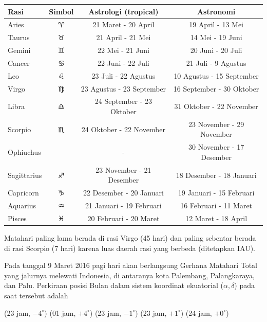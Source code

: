 \documentclass[11pt,fleqn, a4paper]{exam}
\begin{document}
\begin{questions}
\begin{tabular}{|l|c|c|c|}
\hline 
\textbf{Rasi} & \textbf{Simbol} & \textbf{Astrologi (tropical)} & \textbf{Astronomi} \\ 
\hline 
Aries & $\aries$ & 21 Maret - 20 April & 19 April - 13 Mei \\ 
\hline 
Taurus & $\taurus$ & 21 April - 21 Mei &  14 Mei - 19 Juni\\ 
\hline 
Gemini & $\gemini$ & 22 Mei - 21 Juni & 20 Juni - 20 Juli \\ 
\hline 
Cancer & $\cancer$ & 22 Juni - 22 Juli & 21 Juli - 9 Agustus \\ 
\hline 
Leo & $\leo$ & 23 Juli - 22 Agustus & 10 Agustus - 15 September \\ 
\hline 
Virgo & $\virgo$ & 23 Agustus - 23 September & 16 September - 30 Oktober \\ 
\hline 
Libra & $\libra$ & 24 September - 23 Oktober & 31 Oktober - 22 November \\ 
\hline 
Scorpio & $\scorpio$ & 24 Oktober - 22 November & 23 November - 29 November \\ 
\hline 
Ophiuchus &  & - & 30 November - 17 Desember \\ 
\hline 
Sagittarius & $\sagittarius$ & 23 November - 21 Desember & 18 Desember - 18 Januari \\ 
\hline 
Capricorn & $\capricornus$ & 22 Desember - 20 Januari & 19 Januari - 15 Februari \\ 
\hline 
Aquarius & $\aquarius$ & 21 Januari - 19 Februari & 16 Februari - 11 Maret \\ 
\hline 
Pisces & $\pisces$ & 20 Februari - 20 Maret & 12 Maret - 18 April \\ 
\hline 
\end{tabular} 

Matahari paling lama berada di rasi Virgo (45 hari) dan paling sebentar berada di rasi Scorpio (7 hari) karena luas daerah rasi yang berbeda (ditetapkan IAU).

\vspace{0.5cm}
\question Pada tanggal 9 Maret 2016 pagi hari akan berlangsung Gerhana Matahari Total yang jalurnya melewati Indonesia, di antaranya kota Palembang, Palangkaraya, dan Palu. Perkiraan posisi Bulan dalam sistem koordinat ekuatorial ($\alpha, \delta$) pada saat tersebut adalah
\begin{choices}
\choice (23 jam, $-4^{\circ}$)
\choice (01 jam, $+4^{\circ}$)
\choice (23 jam, $-1^{\circ}$)
\choice (23 jam, $+1^{\circ}$)
\choice (24 jam, $+0^{\circ}$)
\end{choices}


\end{questions}
\end{document}
